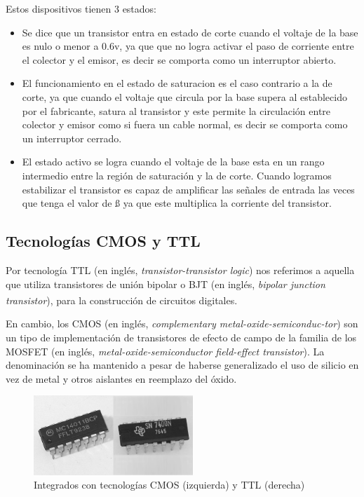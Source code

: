 \documentclass[a4paper]{article}
\let\originalcite\cite
\renewcommand{\cite}[2][]{\textsuperscript{\originalcite{#2}}}
\begin{document}
Estos dispositivos tienen 3 estados:

\begin{itemize}
    \item {
	Se dice que un transistor entra en estado de corte cuando el voltaje
	de la base es nulo o menor a 0.6v, ya que que no logra activar el paso
	de corriente entre el colector y el emisor, es decir se comporta como 
	un interruptor abierto.
    }
    \item {
        El funcionamiento en el estado de saturacion es el caso contrario a la 
	de corte, ya que cuando el voltaje que circula por la base supera al 
	establecido por el fabricante, satura al transistor y este permite la
	 circulación entre colector y emisor como si fuera un cable normal,
	 es decir se comporta como un interruptor cerrado.
    }
    \item {
        El estado activo se logra cuando el voltaje de la base esta en un rango
	intermedio entre la región de saturación y la de corte. 
	Cuando logramos estabilizar el transistor es capaz de amplificar las 
	señales de entrada las veces que tenga el valor de ß ya que este 
	multiplica la corriente del transistor.
    }    
\end{itemize}

\subsection*{Tecnologías CMOS y TTL}

Por tecnología TTL (en inglés, \textit{transistor-transistor logic})
nos referimos a aquella que utiliza transistores de unión bipolar o 
BJT (en inglés, \textit{bipolar junction transistor}), para la 
construcción de circuitos digitales\cite{bib:boylestad}.

En cambio, los CMOS (en inglés, \textit{complementary 
metal-oxide-semiconduc-tor}) son un tipo de implementación de 
transistores de efecto de campo de la familia de los MOSFET (en 
inglés, \textit{metal-oxide-semiconductor field-effect transistor}). 
La denominación se ha mantenido a pesar de haberse generalizado el 
uso de silicio en vez de metal y otros aislantes en reemplazo del 
óxido.

\begin{figure}[h]\centering
    \includegraphics[height=3cm]{transistores.png}
    \caption{Integrados con tecnologías CMOS (izquierda) y TTL 
    (derecha)}\label{fig:transistores}
\end{figure}
\end{document}
